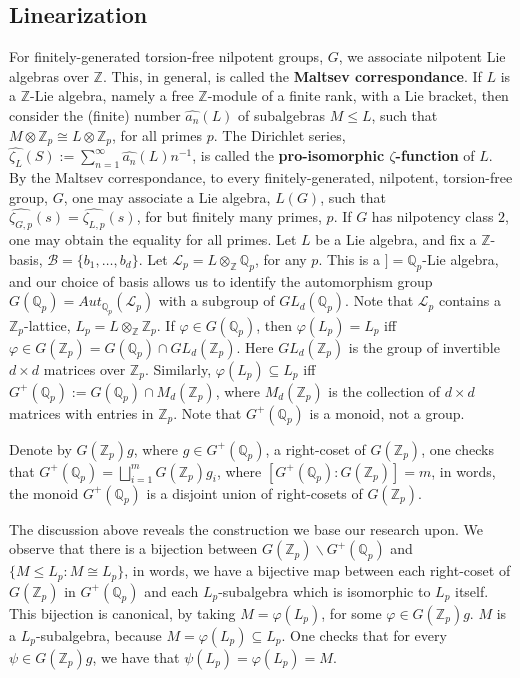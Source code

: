 \documentclass[12pt]{article}
\begin{document}
\subsection{Linearization}
For finitely-generated torsion-free nilpotent groups, $G$, we associate nilpotent Lie algebras over $\mathbb{Z}$. This, in general, is called the \textbf{Maltsev correspondance}. 
If $L$ is a $\mathbb{Z}$-Lie algebra, namely a free $\mathbb{Z}$-module of a finite rank, with a Lie bracket, then consider the (finite) number $\hat{a_n}(L)$ of subalgebras $M\leq L$, such that $M\otimes\mathbb{Z}_p\cong L\otimes\mathbb{Z}_p$, for all primes $p$. The Dirichlet series, $\hat{\zeta_L}(S):=\sum_{n=1}^{\infty}\hat{a_n}(L)n^{-1}$, is called the \textbf{pro-isomorphic $\zeta$-function} of $L$. By the Maltsev correspondance, to every finitely-generated, nilpotent, torsion-free group, $G$, one may associate a Lie algebra, $L(G)$, such that $\hat{\zeta_{G,p}}(s)=\hat{\zeta_{L,p}}(s)$, for but finitely many primes, $p$. If $G$ has nilpotency class $2$, one may obtain the equality for all primes. Let $L$ be a Lie algebra, and fix a $\mathbb{Z}$-basis, $\mathcal{B}=\{b_1,\dots,b_d\}$. Let $\mathcal{L}_p=L\otimes_{\mathbb{Z}}\mathbb{Q}_p$, for any $p$. This is a $]=\mathbb{Q}_p$-Lie algebra, and our choice of basis allows us to identify the automorphism group $G(\mathbb{Q}_p)=Aut_{\mathbb{Q}_p}(\mathcal{L}_p)$ with a subgroup of $GL_d(\mathbb{Q}_p)$. Note that $\mathcal{L}_p$ contains a $\mathbb{Z}_p$-lattice, $L_p=L\otimes_{\mathbb{Z}}\mathbb{Z}_p$. If $\varphi\in G(\mathbb{Q}_p)$, then $\varphi(L_p)=L_p$ iff $\varphi\in G(\mathbb{Z}_p)=G(\mathbb{Q}_p)\cap GL_d(\mathbb{Z}_p)$. Here $GL_d(\mathbb{Z}_p)$ is the group of invertible $d\times d$ matrices over $\mathbb{Z}_p$. Similarly, $\varphi(L_p)\subseteq L_p$ iff $G^{+}(\mathbb{Q}_p):=G(\mathbb{Q}_p)\cap M_d(\mathbb{Z}_p)$, where $M_d(\mathbb{Z}_p)$ is the collection of $d\times d$ matrices with entries in $\mathbb{Z}_p$. Note that $G^{+}(\mathbb{Q}_p)$ is a monoid, not a group.\par
Denote by $G(\mathbb{Z}_p)g$, where $g\in G^{+}(\mathbb{Q}_p)$, a right-coset of $G(\mathbb{Z}_p)$, one checks that $G^+(\mathbb{Q}_p)=\bigsqcup_{i=1}^m G(\mathbb{Z}_p)g_i$, where $[G^{+}(\mathbb{Q}_p):G(\mathbb{Z}_p)]=m$, in words, the monoid $G^{+}(\mathbb{Q}_p)$ is a disjoint union of right-cosets of $G(\mathbb{Z}_p)$.\par
The discussion above reveals the construction we base our research upon.
We observe that there is a bijection between $G(\mathbb{Z}_p)\backslash G^+(\mathbb{Q}_p)$ and $\{M\leq L_p : M\cong L_p\}$, in words, we have a bijective map between each right-coset of $G(\mathbb{Z}_p)$ in $G^{+}(\mathbb{Q}_p)$ and each $L_p$-subalgebra which is isomorphic to $L_p$ itself. This bijection is canonical, by taking $M=\varphi(L_p)$, for some $\varphi\in G(\mathbb{Z}_p)g$. $M$ is a $L_p$-subalgebra, because $M=\varphi(L_p)\subseteq L_p$. One checks that for every $\psi\in G(\mathbb{Z}_p)g$, we have that $\psi(L_p)=\varphi(L_p)=M$.
\end{document}
